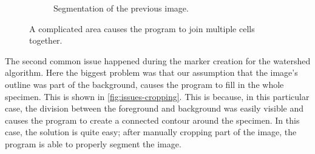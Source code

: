 \documentclass[
  digital,     %
  oneside,     %
  nosansbold,  %
  nocolorbold, %
  lof,         %
  lot,         %
]{fithesis4}
\begin{document}
\begin{figure}
\begin{subfigure}[t]{0.3\linewidth}
        \caption{Segmentation of the previous image.}
    \end{subfigure}
    \caption{A complicated area causes the program to join multiple cells together.}
    \label{fig:issues-joining}
\end{figure}

The second common issue happened during the marker creation for the watershed
algorithm. Here the biggest problem was that our assumption that the image's
outline was part of the background, causes the program to fill in the whole
specimen. This is shown in \ref{fig:issues-cropping}. This is because, in this
particular case, the division between the foreground and background was easily
visible and causes the program to create a connected contour around the
specimen. In this case, the solution is quite easy; after manually cropping part
of the image, the program is able to properly segment the image.
\end{document}
